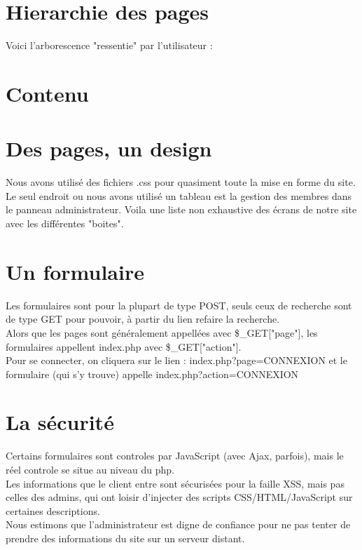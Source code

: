 \section{Hierarchie des pages}
			Voici l'arborescence "ressentie" par l'utilisateur :
			
		\section{Contenu}
			
			
		\section{Des pages, un design}	
			Nous avons utilisé des fichiers .css pour quasiment toute la mise en forme du site. Le seul endroit ou nous avons utilisé un tableau est la gestion des membres dans le panneau administrateur. Voila une liste non exhaustive des écrans de notre site avec les différentes "boites".
					
			
		\section{Un formulaire}
			Les formulaires sont pour la plupart de type POST, seuls ceux de recherche sont de type GET pour pouvoir, à partir du lien refaire la recherche.\\
			Alors que les pages sont généralement appellées avec \$\_GET["page"], les formulaires appellent index.php avec \$\_GET["action"].\\
			Pour se connecter, on cliquera sur le lien : index.php?page=CONNEXION et le formulaire (qui s'y trouve) appelle index.php?action=CONNEXION
		\section{La sécurité}
			Certains formulaires sont controles par JavaScript (avec Ajax, parfois), mais le réel controle se situe au niveau du php.\\
			Les informations que le client entre sont sécurisées pour la faille XSS, mais pas celles des admins, qui ont loisir d'injecter des scripts CSS/HTML/JavaScript sur certaines descriptions.\\
			Nous estimons que l'administrateur est digne de confiance pour ne pas tenter de prendre des informations du site sur un serveur distant.